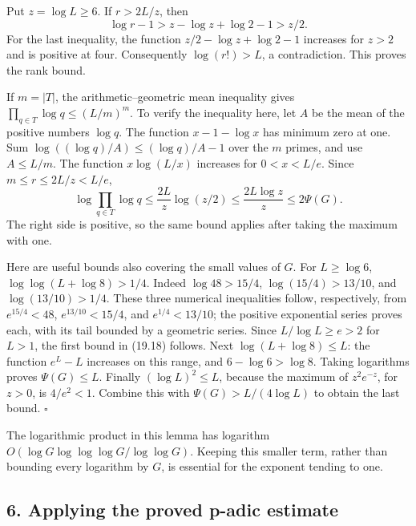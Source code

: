 \documentclass[
  11pt,
  a4paper,
]{article}
\begin{document}
Put \(z=\log L\ge6\). If \(r>2L/z\), then \[
 \log r-1>z-\log z+\log2-1>z/2.
\] For the last inequality, the function \(z/2-\log z+\log2-1\)
increases for \(z>2\) and is positive at four. Consequently
\(\log(r!)>L\), a contradiction. This proves the rank bound.

If \(m=|T|\), the arithmetic--geometric mean inequality gives
\(\prod_{q\in T}\log q\le(L/m)^m\). To verify the inequality here, let
\(A\) be the mean of the positive numbers \(\log q\). The function
\(x-1-\log x\) has minimum zero at one. Sum
\(\log((\log q)/A)\le(\log q)/A-1\) over the \(m\) primes, and use
\(A\le L/m\). The function \(x\log(L/x)\) increases for \(0<x<L/e\).
Since \(m\le r\le2L/z<L/e\), \[
 \log\prod_{q\in T}\log q
 \le\frac{2L}{z}\log(z/2)
 \le\frac{2L\log z}{z}\le2\Psi(G).
\] The right side is positive, so the same bound applies after taking
the maximum with one.

Here are useful bounds also covering the small values of \(G\). For
\(L\ge\log6\), \(\log\log(L+\log8)>1/4\). Indeed \(\log48>15/4\),
\(\log(15/4)>13/10\), and \(\log(13/10)>1/4\). These three numerical
inequalities follow, respectively, from \(e^{15/4}<48\),
\(e^{13/10}<15/4\), and \(e^{1/4}<13/10\); the positive exponential
series proves each, with its tail bounded by a geometric series. Since
\(L/\log L\ge e>2\) for \(L>1\), the first bound in (19.18) follows.
Next \(\log(L+\log8)\le L\): the function \(e^L-L\) increases on this
range, and \(6-\log6>\log8\). Taking logarithms proves \(\Psi(G)\le L\).
Finally \((\log L)^2\le L\), because the maximum of \(z^2e^{-z}\), for
\(z>0\), is \(4/e^2<1\). Combine this with \(\Psi(G)>L/(4\log L)\) to
obtain the last bound. \(\square\)

The logarithmic product in this lemma has logarithm
\(O(\log G\log\log\log G/\log\log G)\). Keeping this smaller term,
rather than bounding every logarithm by \(G\), is essential for the
exponent tending to one.

\subsection{6. Applying the proved p-adic
estimate}\label{applying-the-proved-p-adic-estimate}
\end{document}
